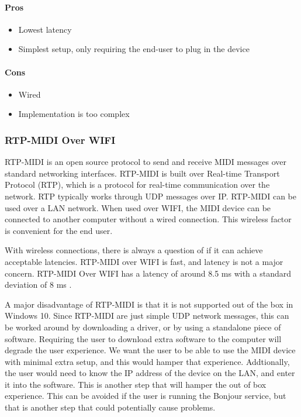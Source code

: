 \paragraph{Pros}

\begin{itemize}
  \item Lowest latency
  \item Simplest setup, only requiring the end-user to plug in the device
\end{itemize}

\paragraph{Cons}

\begin{itemize}
  \item Wired
  \item Implementation is too complex
\end{itemize}

\subsubsection{RTP-MIDI Over WIFI}

RTP-MIDI is an open source protocol to send and receive MIDI messages over standard
networking interfaces. RTP-MIDI is built over Real-time Transport Protocol (RTP), which is
a protocol for real-time communication over the network. RTP typically works through UDP
messages over IP. RTP-MIDI can be used over a LAN network. When used over WIFI, the MIDI
device can be connected to another computer without a wired connection. This wireless
factor is convenient for the end user.

With wireless connections, there is always a question of if it can achieve acceptable
latencies. RTP-MIDI over WIFI is fast, and latency is not a major concern. RTP-MIDI Over
WIFI has a latency of around 8.5 ms with a standard deviation of 8 ms
\autocite{ble-latency}.

A major disadvantage of RTP-MIDI is that it is not supported out of the box in Windows 10.
Since RTP-MIDI are just simple UDP network messages, this can be worked around by
downloading a driver, or by using a standalone piece of software. Requiring the user to
download extra software to the computer will degrade the user experience. We want the user
to be able to use the MIDI device with minimal extra setup, and this would hamper that
experience. Addtionally, the user would need to know the IP address of the device on the
LAN, and enter it into the software. This is another step that will hamper the out of box
experience. This can be avoided if the user is running the Bonjour service, but that is
another step that could potentially cause problems.

